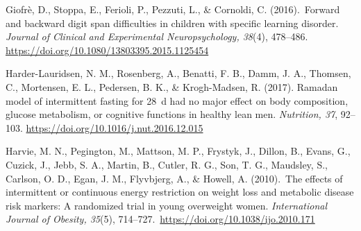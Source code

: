 \documentclass[authordate, empirical]{jote-new-article}
\begin{document}
Giofrè, D., Stoppa, E., Ferioli, P., Pezzuti, L., \& Cornoldi, C. (2016). Forward and backward digit span difficulties in children with specific learning disorder.\emph{ Journal of Clinical and Experimental Neuropsychology, 38}(4), 478--486. \url{https://doi.org/10.1080/13803395.2015.1125454}












Harder-Lauridsen, N. M., Rosenberg, A., Benatti, F. B., Damm, J. A., Thomsen, C., Mortensen, E. L., Pedersen, B. K., \& Krogh-Madsen, R. (2017). Ramadan model of intermittent fasting for 28 d had no major effect on body composition, glucose metabolism, or cognitive functions in healthy lean men. \emph{Nutrition, 37}, 92--103. \url{https://doi.org/10.1016/j.nut.2016.12.015}



Harvie, M. N., Pegington, M., Mattson, M. P., Frystyk, J., Dillon, B., Evans, G., Cuzick, J., Jebb, S. A., Martin, B., Cutler, R. G., Son, T. G., Maudsley, S., Carlson, O. D., Egan, J. M., Flyvbjerg, A., \& Howell, A. (2010). The effects of intermittent or continuous energy restriction on weight loss and metabolic disease risk markers: A randomized trial in young overweight women.\emph{ International Journal of Obesity, 35}(5), 714--727. \url{https://doi.org/10.1038/ijo.2010.171}



\end{document}
